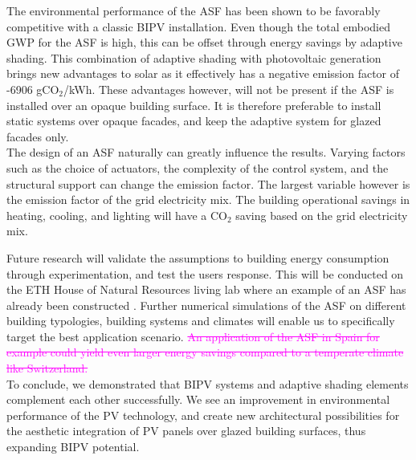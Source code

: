 
The environmental performance of the ASF has been shown to be favorably competitive with a classic BIPV installation. Even though the total embodied GWP for the ASF is high, this can be offset through energy savings by adaptive shading. This combination of adaptive shading with photovoltaic generation brings new advantages to solar as it effectively has a negative emission factor of -6906 gCO${_2}$/kWh. These advantages however, will not be present if the ASF is installed over an opaque building surface. It is therefore preferable to install static systems over opaque facades, and keep the adaptive system for glazed facades only.\\

The design of an ASF naturally can greatly influence the results. Varying factors such as the choice of actuators, the complexity of the control system, and the structural support can change the emission factor. The largest variable however is the emission factor of the grid electricity mix. The building operational savings in heating, cooling, and lighting will have a CO${_2}$ saving based on the grid electricity mix. 

Future research will validate the assumptions to building energy consumption through experimentation, and test the users response. This will be conducted on the ETH House of Natural Resources living lab where an example of an ASF has already been constructed \cite{nagy2015frontiers}. Further numerical simulations of the ASF on different building typologies, building systems and climates will enable us to specifically target the best application scenario. \textcolor{magenta}{\sout{An application of the ASF in Spain for example could yield even larger energy savings compared to a temperate climate like Switzerland.}}\\

To conclude, we demonstrated that BIPV systems and adaptive shading elements complement each other successfully. We see an improvement in environmental performance of the PV technology, and create new architectural possibilities for the aesthetic integration of PV panels over glazed building surfaces, thus expanding BIPV potential. 






